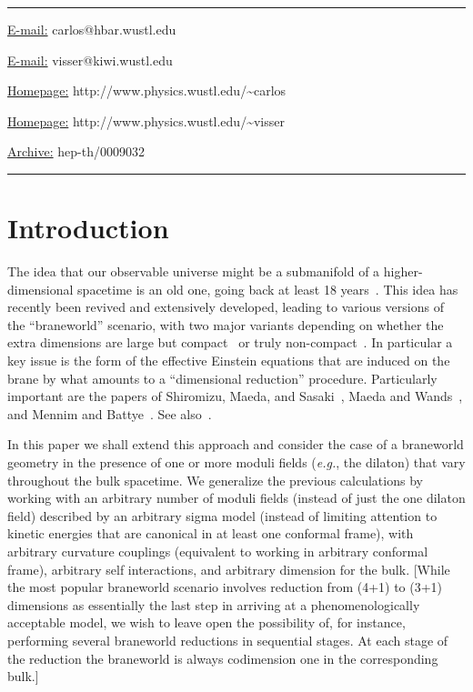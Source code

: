 \documentclass[a4paper,10pt]{article}
\begin{document}
\vfill
\hrule
\bigskip
\centerline{\underline{E-mail:} {\sf carlos@hbar.wustl.edu}}
\centerline{\underline{E-mail:} {\sf visser@kiwi.wustl.edu}}
\bigskip
\centerline{\underline{Homepage:} {\sf http://www.physics.wustl.edu/\~{}carlos}}
\centerline{\underline{Homepage:} {\sf http://www.physics.wustl.edu/\~{}visser}}
\bigskip
\centerline{\underline{Archive:}
{\sf hep-th/0009032}}
\bigskip
\hrule
\clearpage
\def\Box{\nabla^2}
\def\d{{\mathrm d}}
\def\ie{{\em i.e.\/}}
\def\eg{{\em e.g.\/}}
\def\etc{{\em etc.\/}}
\def\etal{{\em et al.\/}}
\def\S{{\mathcal S}}
\def\I{{\mathcal I}}
\def\L{{\mathcal L}}
\def\H{{\mathcal H}}
\def\M{{\mathcal M}}
\def\R{{\mathcal R}}
\def\K{{\mathcal K}}
\def\F{{\mathcal F}}
\def\E{{\mathcal E}}
\def\eff{{\mathrm{eff}}}
\def\Newton{{\mathrm{Newton}}}
\def\Einstein{{\mathrm{Einstein}}}
\def\bulk{{\mathrm{bulk}}}
\def\brane{{\mathrm{brane}}}
\def\matter{{\mathrm{matter}}}
\def\tr{{\mathrm{tr}}}
\def\normal{{\mathrm{normal}}}
\def\implies{\Rightarrow}
\def\half{{1\over2}}
\def\effective{{\mathrm{effective}}}
\def\anomalous{{\mathrm{anomalous}}}
\def\quadratic{{\mathrm{quadratic}}}
\def\Eotvos{{E\"otv\"os}}
\def\HRULE{\bigskip\hrule\bigskip}


\section{Introduction}
\label{S:introduction}

The idea that our observable universe might be a submanifold of a
higher-dimensional spacetime is an old one, going back at least 18
years~\cite{old-non-compact}. This idea has recently been revived and
extensively developed, leading to various versions of the
``braneworld'' scenario, with two major variants depending on whether
the extra dimensions are large but compact~\cite{large-compact} or
truly non-compact~\cite{RS,Gogberashvili,Arkani-et-al}.  In particular
a key issue is the form of the effective Einstein equations that are
induced on the brane by what amounts to a ``dimensional reduction''
procedure. Particularly important are the papers of Shiromizu, Maeda,
and Sasaki~\cite{Shiromizu}, Maeda and Wands~\cite{Wands}, and Mennim
and Battye~\cite{Mennim}. See also~\cite{background-1,background-2}.


In this paper we shall extend this approach and consider the case of a
braneworld geometry in the presence of one or more moduli fields (\eg,
the dilaton) that vary throughout the bulk spacetime. We generalize
the previous calculations by working with an arbitrary number of
moduli fields (instead of just the one dilaton field) described by an
arbitrary sigma model (instead of limiting attention to kinetic
energies that are canonical in at least one conformal frame), with
arbitrary curvature couplings (equivalent to working in arbitrary
conformal frame), arbitrary self interactions, and arbitrary dimension
for the bulk.  [While the most popular braneworld scenario involves
reduction from (4+1) to (3+1) dimensions as essentially the last step
in arriving at a phenomenologically acceptable model, we wish to leave
open the possibility of, for instance, performing several braneworld
reductions in sequential stages.  At each stage of the reduction the
braneworld is always codimension one in the corresponding bulk.]
\end{document}
